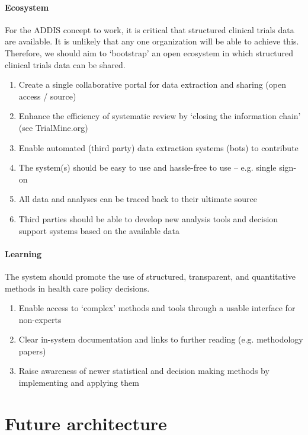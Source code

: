\documentclass[a4paper]{article}
\begin{document}
\paragraph{Ecosystem}
For the ADDIS concept to work, it is critical that structured clinical trials data are available.
It is unlikely that any one organization will be able to achieve this.
Therefore, we should aim to `bootstrap' an open ecosystem in which structured clinical trials data can be shared.
\begin{enumerate}[label=E\arabic*]
\item\label{ePortal} Create a single collaborative portal for data extraction and sharing (open access / source)
\item\label{eReview} Enhance the efficiency of systematic review by `closing the information chain' (see TrialMine.org)
\item\label{eBot} Enable automated (third party) data extraction systems (bots) to contribute
\item\label{eEaseOfUse} The system(s) should be easy to use and hassle-free to use -- e.g. single sign-on
\item\label{eTraceability} All data and analyses can be traced back to their ultimate source
\item\label{eThirdParty} Third parties should be able to develop new analysis tools and decision support systems based on the available data
\end{enumerate}

\paragraph{Learning}
The system should promote the use of structured, transparent, and quantitative methods in health care policy decisions.
\begin{enumerate}[label=L\arabic*]
\item\label{lAccess} Enable access to `complex' methods and tools through a usable interface for non-experts
\item\label{lDocumentation} Clear in-system documentation and links to further reading (e.g. methodology papers)
\item\label{lAwareness} Raise awareness of newer statistical and decision making methods by implementing and applying them
\end{enumerate}

\section{Future architecture}
\end{document}
